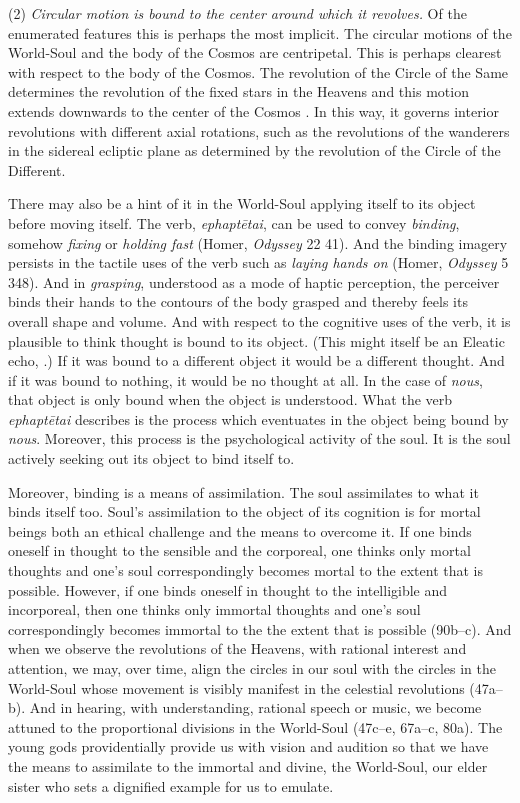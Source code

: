(2) \emph{Circular motion is bound to the center around which it revolves.} Of the enumerated features this is perhaps the most implicit. The circular motions of the World-Soul and the body of the Cosmos are centripetal. This is perhaps clearest with respect to the body of the Cosmos. The revolution of the Circle of the Same determines the revolution of the fixed stars in the Heavens and this motion extends downwards to the center of the Cosmos \citep[32]{Vlastos:1975aa}. In this way, it governs interior revolutions with different axial rotations, such as the revolutions of the wanderers in the sidereal ecliptic plane as determined by the revolution of the Circle of the Different.

There may also be a hint of it in the World-Soul applying itself to its object before moving itself. The verb, \emph{ephaptētai}, can be used to convey \emph{binding}, somehow \emph{fixing} or \emph{holding fast} (Homer, \emph{Odyssey} 22 41). And the binding imagery persists in the tactile uses of the verb such as \emph{laying hands on} (Homer, \emph{Odyssey} 5 348). And in \emph{grasping}, understood as a mode of haptic perception, the perceiver binds their hands to the contours of the body grasped and thereby feels its overall shape and volume. And with respect to the cognitive uses of the verb, it is plausible to think thought is bound to its object. (This might itself be an Eleatic echo, \citealt[192]{Mourelatos:2008ve}.) If it was bound to a different object it would be a different thought. And if it was bound to nothing, it would be no thought at all. In the case of \emph{nous}, that object is only bound when the object is understood. What the verb \emph{ephaptētai} describes is the process which eventuates in the object being bound by \emph{nous}. Moreover, this process is the psychological activity of the soul. It is the soul actively seeking out its object to bind itself to. 

Moreover, binding is a means of assimilation. The soul assimilates to what it binds itself too. Soul's assimilation to the object of its cognition is for mortal beings both an ethical challenge and the means to overcome it. If one binds oneself in thought to the sensible and the corporeal, one thinks only mortal thoughts and one's soul correspondingly becomes mortal to the extent that is possible. However, if one binds oneself in thought to the intelligible and incorporeal, then one thinks only immortal thoughts and one's soul correspondingly becomes immortal to the the extent that is possible (90b--c). And when we observe the revolutions of the Heavens, with rational interest and attention, we may, over time, align the circles in our soul with the circles in the World-Soul whose movement is visibly manifest in the celestial revolutions (47a--b). And in hearing, with understanding, rational speech or music, we become attuned to the proportional divisions in the World-Soul (47c--e, 67a--c, 80a). The young gods providentially provide us with vision and audition so that we have the means to assimilate to the immortal and divine, the World-Soul, our elder sister who sets a dignified example for us to emulate.

